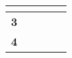 \documentclass[12pt,a4paper,twoside]{article}
\begin{document}
\begin{longtable}{|>{\centering\arraybackslash}m{10cm}|>{\centering\arraybackslash}m{1.5cm}|>{\centering\arraybackslash}m{1.5cm}|>{\centering\arraybackslash}m{1.5cm}|>{\centering\arraybackslash}m{1.5cm}|}
                        
                    
                        
                            & \cellcolor{gray!20} \textbf{}
                        
                    
                    \\ \hline
                
                    \cellcolor{gray!20} \textbf{ 3 }
                     
                        
                            

                            
                                 & \textbf{}
                            

                        
                    
                        
                            

                            
                                 & \textbf{}
                            

                        
                    
                        
                            

                            
                                 & \textbf{}
                            

                        
                    
                        
                            & \cellcolor{gray!20} \textbf{}
                        
                    
                    \\ \hline
                
                    \cellcolor{gray!20} \textbf{ 4 }
                     
                        
                            

                            
                                 & \textbf{}
                            

                        
                    
                        
                            

                            
                                 & \textbf{}
                            


\end{longtable}
\end{document}

